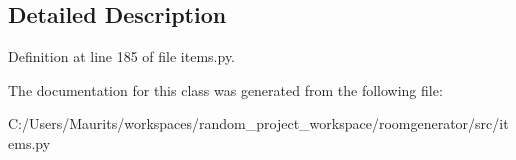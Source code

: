 \subsection{Detailed Description}


Definition at line 185 of file items.\+py.



The documentation for this class was generated from the following file\+:\begin{DoxyCompactItemize}
\item 
C\+:/\+Users/\+Maurits/workspaces/random\+\_\+project\+\_\+workspace/roomgenerator/src/items.\+py\end{DoxyCompactItemize}
